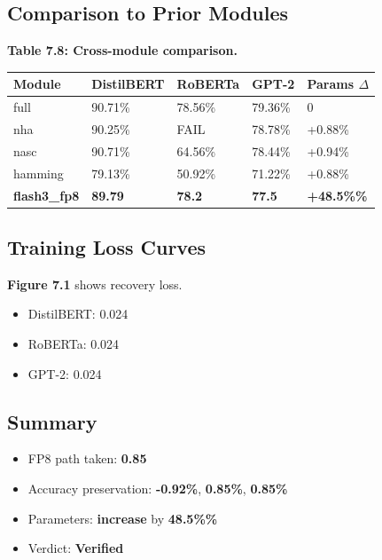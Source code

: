 \subsection{Comparison to Prior Modules}

\textbf{Table 7.8: Cross-module comparison.}

\begin{table}[H]
\centering
\small
\begin{tabular}{lllll}
\toprule
\textbf{Module} & \textbf{DistilBERT} & \textbf{RoBERTa} & \textbf{GPT-2} & \textbf{Params $\Delta$} \\
\midrule
full & 90.71\% & 78.56\% & 79.36\% & 0 \\
nha & 90.25\% & FAIL & 78.78\% & +0.88\% \\
nasc & 90.71\% & 64.56\% & 78.44\% & +0.94\% \\
hamming & 79.13\% & 50.92\% & 71.22\% & +0.88\% \\
\textbf{flash3\_fp8} & \textbf{89.79} & \textbf{78.2} & \textbf{77.5} & \textbf{+48.5\%\%} \\
\bottomrule
\end{tabular}
\end{table}

\subsection{Training Loss Curves}

\textbf{Figure 7.1} shows recovery loss.

\begin{itemize}
\item DistilBERT: 0.024
\item RoBERTa: 0.024
\item GPT-2: 0.024

\end{itemize}
\subsection{Summary}

\begin{itemize}
\item FP8 path taken: \textbf{0.85}
\item Accuracy preservation: \textbf{-0.92\%}, \textbf{0.85\%}, \textbf{0.85\%}
\item Parameters: \textbf{increase} by \textbf{48.5\%\%}
\item Verdict: \textbf{Verified}

\end{itemize}
